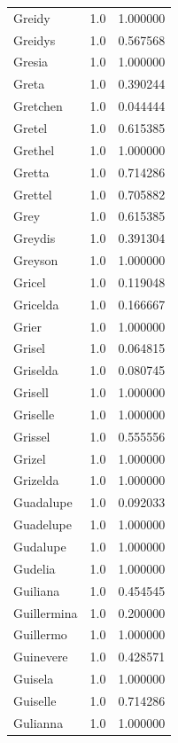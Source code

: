 \documentclass[
  letterpaper,
  DIV=11,
  numbers=noendperiod]{scrreprt}
\begin{document}
\begin{tabular}{lrr}
Greidy          &   1.0 &   1.000000 \\
Greidys         &   1.0 &   0.567568 \\
Gresia          &   1.0 &   1.000000 \\
Greta           &   1.0 &   0.390244 \\
Gretchen        &   1.0 &   0.044444 \\
Gretel          &   1.0 &   0.615385 \\
Grethel         &   1.0 &   1.000000 \\
Gretta          &   1.0 &   0.714286 \\
Grettel         &   1.0 &   0.705882 \\
Grey            &   1.0 &   0.615385 \\
Greydis         &   1.0 &   0.391304 \\
Greyson         &   1.0 &   1.000000 \\
Gricel          &   1.0 &   0.119048 \\
Gricelda        &   1.0 &   0.166667 \\
Grier           &   1.0 &   1.000000 \\
Grisel          &   1.0 &   0.064815 \\
Griselda        &   1.0 &   0.080745 \\
Grisell         &   1.0 &   1.000000 \\
Griselle        &   1.0 &   1.000000 \\
Grissel         &   1.0 &   0.555556 \\
Grizel          &   1.0 &   1.000000 \\
Grizelda        &   1.0 &   1.000000 \\
Guadalupe       &   1.0 &   0.092033 \\
Guadelupe       &   1.0 &   1.000000 \\
Gudalupe        &   1.0 &   1.000000 \\
Gudelia         &   1.0 &   1.000000 \\
Guiliana        &   1.0 &   0.454545 \\
Guillermina     &   1.0 &   0.200000 \\
Guillermo       &   1.0 &   1.000000 \\
Guinevere       &   1.0 &   0.428571 \\
Guisela         &   1.0 &   1.000000 \\
Guiselle        &   1.0 &   0.714286 \\
Gulianna        &   1.0 &   1.000000 \\

\end{tabular}
\end{document}
